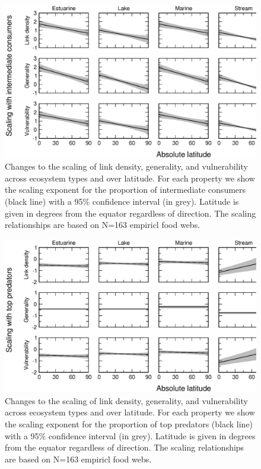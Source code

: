 \documentclass[12pt]{article}
\begin{document}
\newpage

\begin{figure}[h]
\includegraphics[width=.85\textwidth]{Figures/by_TL/marginal/I_marginal_latitude_proportions.eps}
\caption{Changes to the scaling of link density, generality, and vulnerability across ecosystem
types and over latitude. For each property we show the scaling exponent for the proportion of
intermediate consumers (black line) with a 95\% confidence interval (in grey). Latitude is given in degrees
from the equator regardless of direction. The scaling relationships are based on N=163 empiricl food webs.}
\label{I}
\end{figure}

\begin{figure}[h]
\includegraphics[width=.85\textwidth]{Figures/by_TL/marginal/T_marginal_latitude_proportions.eps}
\caption{Changes to the scaling of link density, generality, and vulnerability across ecosystem
types and over latitude. For each property we show the scaling exponent for the proportion of
top predators (black line) with a 95\% confidence interval (in grey). Latitude is given in degrees
from the equator regardless of direction. The scaling relationships are based on N=163 empiricl food webs.}
\label{T}
\end{figure}
\end{document}
